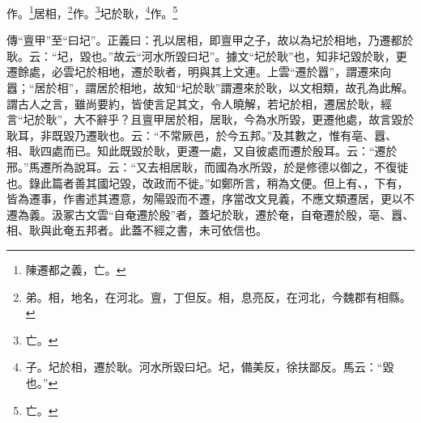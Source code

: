 作。\footnote{陳遷都之義，亡。}居相，\footnote{弟。相，地名，在河北。亶，丁但反。相，息亮反，在河北，今魏郡有相縣。}作。\footnote{亡。}圮於耿，\footnote{子。圮於相，遷於耿。河水所毀曰圮。圮，備美反，徐扶鄙反。馬云：“毀也。”}作。\footnote{亡。}

{\noindent\zhuan{}\fzbyks 傳“亶甲”至“曰圮”。正義曰：孔以居相，即亶甲之子，故以為圮於相地，乃遷都於耿。云：“圮，毀也。”故云“河水所毀曰圮”。據文“圮於耿”也，知非圮毀於耿，更遷餘處，必雲圮於相地，遷於耿者，明與其上文連。上雲“遷於囂”，謂遷來向囂；“居於相”，謂居於相地，故知“圮於耿”謂遷來於耿，以文相類，故孔為此解。謂古人之言，雖尚要約，皆使言足其文，令人曉解，若圮於相，遷居於耿，經言“圮於耿”，大不辭乎？且亶甲居於相，居耿，今為水所毀，更遷他處，故言毀於耿耳，非既毀乃遷耿也。云：“不常厥邑，於今五邦。”及其數之，惟有亳、囂、相、耿四處而已。知此既毀於耿，更遷一處，又自彼處而遷於殷耳。云：“遷於邢。”馬遷所為說耳。云：“又去相居耿，而國為水所毀，於是修德以御之，不復徙也。錄此篇者善其國圮毀，改政而不徙。”如鄭所言，稍為文便。但上有、，下有，皆為遷事，作書述其遷意，匆陽毀而不遷，序當改文見義，不應文類遷居，更以不遷為義。汲冢古文雲“自奄遷於殷”者，蓋圮於耿，遷於奄，自奄遷於殷，亳、囂、相、耿與此奄五邦者。此蓋不經之書，未可依信也。 \par}

